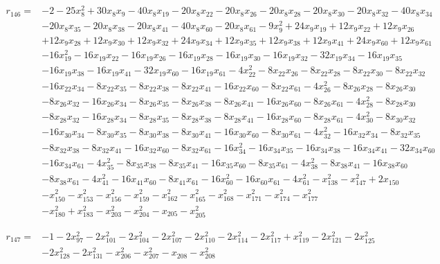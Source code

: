 \begin{align*}
r_{146}={}&-2-25x_{8}^{2}+30x_{8}x_{9}-40x_{8}x_{19}-20x_{8}x_{22}-20x_{8}x_{26}-20x_{8}x_{28}-20x_{8}x_{30}-20x_{8}x_{32}-40x_{8}x_{34}\\
&-20x_{8}x_{35}-20x_{8}x_{38}-20x_{8}x_{41}-40x_{8}x_{60}-20x_{8}x_{61}-9x_{9}^{2}+24x_{9}x_{19}+12x_{9}x_{22}+12x_{9}x_{26}\\
&+12x_{9}x_{28}+12x_{9}x_{30}+12x_{9}x_{32}+24x_{9}x_{34}+12x_{9}x_{35}+12x_{9}x_{38}+12x_{9}x_{41}+24x_{9}x_{60}+12x_{9}x_{61}\\
&-16x_{19}^{2}-16x_{19}x_{22}-16x_{19}x_{26}-16x_{19}x_{28}-16x_{19}x_{30}-16x_{19}x_{32}-32x_{19}x_{34}-16x_{19}x_{35}\\
&-16x_{19}x_{38}-16x_{19}x_{41}-32x_{19}x_{60}-16x_{19}x_{61}-4x_{22}^{2}-8x_{22}x_{26}-8x_{22}x_{28}-8x_{22}x_{30}-8x_{22}x_{32}\\
&-16x_{22}x_{34}-8x_{22}x_{35}-8x_{22}x_{38}-8x_{22}x_{41}-16x_{22}x_{60}-8x_{22}x_{61}-4x_{26}^{2}-8x_{26}x_{28}-8x_{26}x_{30}\\
&-8x_{26}x_{32}-16x_{26}x_{34}-8x_{26}x_{35}-8x_{26}x_{38}-8x_{26}x_{41}-16x_{26}x_{60}-8x_{26}x_{61}-4x_{28}^{2}-8x_{28}x_{30}\\
&-8x_{28}x_{32}-16x_{28}x_{34}-8x_{28}x_{35}-8x_{28}x_{38}-8x_{28}x_{41}-16x_{28}x_{60}-8x_{28}x_{61}-4x_{30}^{2}-8x_{30}x_{32}\\
&-16x_{30}x_{34}-8x_{30}x_{35}-8x_{30}x_{38}-8x_{30}x_{41}-16x_{30}x_{60}-8x_{30}x_{61}-4x_{32}^{2}-16x_{32}x_{34}-8x_{32}x_{35}\\
&-8x_{32}x_{38}-8x_{32}x_{41}-16x_{32}x_{60}-8x_{32}x_{61}-16x_{34}^{2}-16x_{34}x_{35}-16x_{34}x_{38}-16x_{34}x_{41}-32x_{34}x_{60}\\
&-16x_{34}x_{61}-4x_{35}^{2}-8x_{35}x_{38}-8x_{35}x_{41}-16x_{35}x_{60}-8x_{35}x_{61}-4x_{38}^{2}-8x_{38}x_{41}-16x_{38}x_{60}\\
&-8x_{38}x_{61}-4x_{41}^{2}-16x_{41}x_{60}-8x_{41}x_{61}-16x_{60}^{2}-16x_{60}x_{61}-4x_{61}^{2}-x_{138}^{2}-x_{147}^{2}+2x_{150}\\
&-x_{150}^{2}-x_{153}^{2}-x_{156}^{2}-x_{159}^{2}-x_{162}^{2}-x_{165}^{2}-x_{168}^{2}-x_{171}^{2}-x_{174}^{2}-x_{177}^{2}\\
&-x_{180}^{2}+x_{183}^{2}-x_{203}^{2}-x_{204}^{2}-x_{205}-x_{205}^{2}
\end{align*}

\begin{align*}
r_{147}={}&-1-2x_{97}^{2}-2x_{101}^{2}-2x_{104}^{2}-2x_{107}^{2}-2x_{110}^{2}-2x_{114}^{2}-2x_{117}^{2}+x_{119}^{2}-2x_{121}^{2}-2x_{125}^{2}\\
&-2x_{128}^{2}-2x_{131}^{2}-x_{206}^{2}-x_{207}^{2}-x_{208}-x_{208}^{2}
\end{align*}

